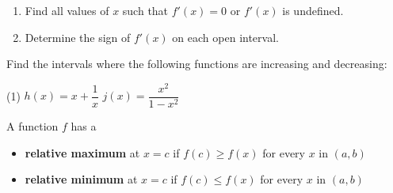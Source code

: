 \documentclass[../mathNotesPreamble]{subfiles}
\begin{document}
  \begin{thmBox*}
    \begin{enumerate}
      \item Find all values of $x$ such that $f'(x)=0$ or $f'(x)$ is undefined.
      \item Determine the sign of $f'(x)$ on each open interval.
    \end{enumerate}
  \end{thmBox*}
  \begin{ex*}
    Find the intervals where the following functions are increasing and decreasing:
  \end{ex*}
  \pagebreak

  \begin{extasks}[after-item-skip=\stretch{1}](1)
    \task $h(x)=x+\dfrac{1}{x}$
    \task $j(x)=\dfrac{x^2}{1-x^2}$
  \end{extasks}
  \pagebreak

  \begin{defn*}
    A function $f$ has a
    \begin{itemize}
      \item
        \textbf{relative maximum} at $x=c$ if $f(c)\geq f(x)$ for every $x$ in $(a,b)$
      \item
        \textbf{relative minimum} at $x=c$ if $f(c)\leq f(x)$ for every $x$ in $(a,b)$
    \end{itemize}
  \end{defn*}
\end{document}
